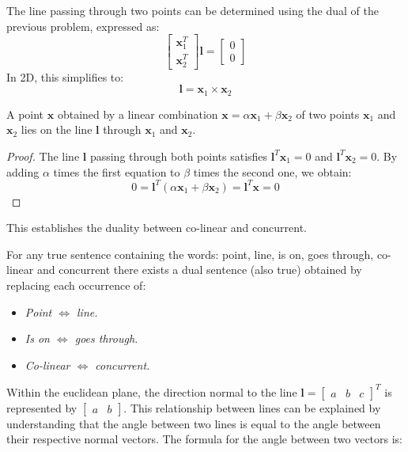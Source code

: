 The line passing through two points can be determined using the dual of the previous problem, expressed as:
\[\begin{bmatrix} \mathbf{x}_1^T \\ \mathbf{x}_2^T \end{bmatrix} \mathbf{l} = \begin{bmatrix} 0 \\ 0 \end{bmatrix}\]
In 2D, this simplifies to: 
\[\mathbf{l}=\mathbf{x}_1 \times \mathbf{x}_2\] 
\begin{property}
    A point $\mathbf{x}$ obtained by a linear combination $\mathbf{x}=\alpha \mathbf{x}_1+\beta \mathbf{x}_2$ of two points $\mathbf{x}_1$ and $\mathbf{x}_2$ lies on the line $\mathbf{l}$ through $\mathbf{x}_1$ and $\mathbf{x}_2$. 
\end{property}
\begin{proof}
    The line $\mathbf{l}$ passing through both points satisfies  $\mathbf{l}^T\mathbf{x}_1=0$ and  $\mathbf{l}^T\mathbf{x}_2=0$. 
    By adding $\alpha$ times the first equation to $\beta$ times the second one, we obtain: 
    \[0=\mathbf{l}^T\left( \alpha \mathbf{x}_1+\beta \mathbf{x}_2 \right)=\mathbf{l}^T\mathbf{x}=0\]
\end{proof}
This establishes the duality between co-linear and concurrent.
\begin{theorem}
    For any true sentence containing the words: point, line, is on, goes through, co-linear and concurrent there exists a dual sentence (also true) obtained by replacing each occurrence of:
\end{theorem}
\begin{itemize}
    \item \textit{Point $\Leftrightarrow$ line.}
    \item \textit{Is on $\Leftrightarrow$ goes through.}
    \item \textit{Co-linear $\Leftrightarrow$ concurrent.}
\end{itemize}
Within the euclidean plane, the direction normal to the line $\mathbf{l}={\begin{bmatrix} a & b & c \end{bmatrix}}^T$ is represented by $\begin{bmatrix} a & b \end{bmatrix}$. 
This relationship between lines can be explained by understanding that the angle between two lines is equal to the angle between their respective normal vectors. 
The formula for the angle between two vectors is:
